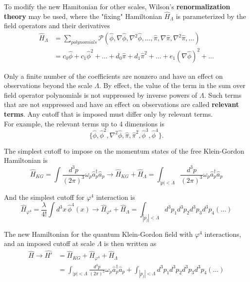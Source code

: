 \noindent To modify the new Hamitonian for other scales, Wilson's \textbf{renormalization theory} may be used, where the "fixing" Hamiltonian $\hat{H}_\Lambda$ is parameterized by the field operators and their derivatives
\begin{align}
\hat{H}_\Lambda &= \sum_{polynomials} \mathcal{P}(\hat{\phi}, \nabla \hat{\phi}, \nabla^2 \hat{\phi}, \dots, \hat{\pi}, \nabla \hat{\pi}, \nabla^2 \hat{\pi}, \dots) \\
&= c_0 \hat{\phi} + c_1 \hat{\phi}^2 + \dots + d_0 \hat{\pi} + d_1 \hat{\pi}^2 + \dots + e_1 (\nabla \hat{\phi})^2 + \dots
\end{align}

\noindent Only a finite number of the coefficients are nonzero and have an effect on observations beyond the scale $\Lambda$. By effect, the value of the term in the sum over field operator polynomials is not suppressed by inverse powers of $\Lambda$. Such terms that are not suppressed and have an effect on observations are called \textbf{relevant terms}. Any cutoff that is imposed must differ only by relevant terms. \\

\noindent For example, the relevant terms up to 4 dimensions is 
\begin{equation}
\{ \hat{\phi}, \hat{\phi}^2, \nabla^2 \hat{\phi}, \hat{\pi}, \hat{\pi}^2, \hat{\phi}^3, \hat{\phi}^4 \}.
\end{equation}

\noindent The simplest cutoff to impose on the momentum states of the free Klein-Gordon Hamiltonian is
\begin{equation}
\hat{H}_{KG} = \int \frac{d^3 p}{(2\pi)^3} \omega_p \hat{a}_p^\dagger \hat{a}_p \to \hat{H}_{KG}+\hat{H}_\Lambda = \int_{|p|<\Lambda} \frac{d^3 p}{(2\pi)^3} \omega_p \hat{a}_p^\dagger \hat{a}_p
\end{equation}

\noindent And the simplest cutoff for $\varphi^4$ interaction is
\begin{equation}
\hat{H}_{\varphi^4} = \frac{\lambda}{4 !} \int d^3 x \, \hat{\phi}^4(x) \to \hat{H}_{\varphi^4} + \hat{H}_\Lambda = \int_{|p_j|<\Lambda} d^3 p_1 d^3 p_2 d^3 p_3 d^3 p_4 (\dots)
\end{equation}

\noindent The new Hamiltonian for the quantum Klein-Gordon field with $\varphi^4$ interactions, and an imposed cutoff at scale $\Lambda$ is then written as
\begin{align}
\hat{H} \to \hat{H'} &= \hat{H}_{KG} + \hat{H}_{\varphi^4} + \hat{H}_\Lambda \\
&= \int_{|p|<\Lambda} \frac{d^3 p}{(2\pi)^3} \omega_p \hat{a}_p^\dagger \hat{a}_p + \int_{|p_j|<\Lambda} d^3 p_1 d^3 p_2 d^3 p_3 d^3 p_4 (\dots)
\end{align}